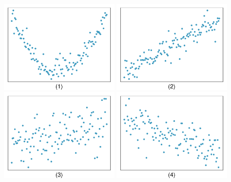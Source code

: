 \noindent \begin{minipage}[c]{0.43\textwidth}
\end{minipage}
\begin{minipage}[c]{0.57\textwidth}
\begin{center}
\includegraphics[width=0.45\textwidth]{07/figures/eoce/corrMatch/corrMatch1.pdf}
\includegraphics[width= 0.45\textwidth]{07/figures/eoce/corrMatch/corrMatch2.pdf} \\
\includegraphics[width= 0.45\textwidth]{07/figures/eoce/corrMatch/corrMatch3.pdf}
\includegraphics[width= 0.45\textwidth]{07/figures/eoce/corrMatch/corrMatch4.pdf}
\end{center}
\end{minipage}

